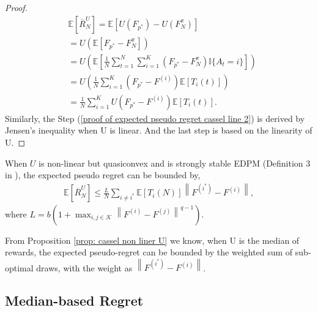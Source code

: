 \begin{proof}
\begin{align}
     & \mathbb{E}[\overline{R}_N^{U}]
     = \mathbb{E}\left[U\left(F_{p^{*}}\right)-U\left(F_{N}^{\pi}\right)\right]\\
\label{proof of expected pseudo regret cassel line 2}
     &=U\left(\mathbb{E}\left[F_{p^{*}}-F_{N}^{\pi}\right]\right)\\
\label{proof of expected pseudo regret cassel line 3}
      &= U\left(\mathbb{E}\left[\frac{1}{N} \sum_{t=1}^{N} \sum_{i = 1}^{K} \left(F_{p^{*}}-F_{N}^{\pi}\right) \mathbb{I}\{A_t = i\}\right]\right)\\
\label{proof of expected pseudo regret cassel line 4}
     &= U\left(\frac{1}{N} \sum_{i = 1}^{K} \left(F_{p^\ast} - F^{(i)}\right) \mathbb{E}\left[T_i(t)\right]\right)\\
\label{proof of expected pseudo regret cassel line 5}
     &=\frac{1}{N} \sum_{i = 1}^{K}  U\left(F_{p^\ast} - F^{(i)}\right) \mathbb{E}\left[T_i(t)\right].
\end{align}
\endgroup
Similarly, the Step (\ref{proof of expected pseudo regret cassel line 2}) is derived by Jensen's inequality when U is linear. And the last step is based on the linearity of U.
\end{proof}


\begin{prop}
\label{prop: cassel non liner U}
When $U$ is non-linear but quasiconvex and is strongly stable EDPM (Definition 3 in \cite{cassel_general_2018}), the expected pseudo regret can be bounded by,
        \begin{align}
            \mathbb{E}[\overline{R}^{U}_N] \leq \frac{L}{N} \sum_{i \neq i^{*}} \mathbb{E}\left[T_{i}(N)\right]\left\|F^{\left(i^{*}\right)}-F^{(i)}\right\|,
        \end{align}
where $L=b\left(1+\max _{i, j \in \mathcal{K}}\left\|F^{(i)}-F^{(j)}\right\|^{q-1}\right)$.
\end{prop}

 From Proposition \ref{prop: cassel non liner U} we know, when U is the median of rewards, the expected pseudo-regret can be bounded by the weighted sum of sub-optimal draws, with the weight as $\left\|F^{\left(i^{*}\right)}-F^{(i)}\right\|$. 

\subsection{Median-based Regret}

